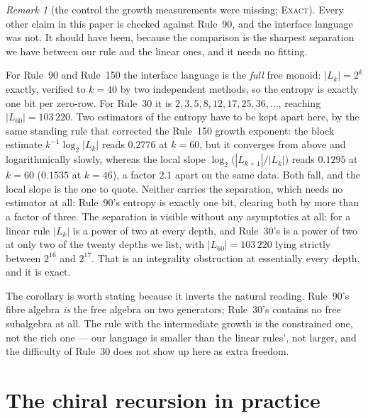 \documentclass[11pt]{article}
\theoremstyle{definition}
\theoremstyle{remark}
\newtheorem{remark}[theorem]{Remark}
\newcommand{\EXACT}{\textsc{Exact}}
\begin{document}
\begin{remark}[the control the growth measurements were missing; \EXACT]\label{ex:l90}
Every other claim in this paper is checked against Rule~90, and the interface language was not. It
should have been, because the comparison is the sharpest separation we have between our rule and the
linear ones, and it needs no fitting.

For Rule~90 and Rule~150 the interface language is the \emph{full} free monoid: $|L_k|=2^k$ exactly,
verified to $k=40$ by two independent methods, so the entropy is exactly one bit per zero-row. For
Rule~30 it is $2,3,5,8,12,17,25,36,\dots$, reaching $|L_{60}|=103\,220$. Two estimators of the entropy
have to be kept apart here, by the same standing rule that corrected the Rule~150 growth exponent: the
block estimate $k^{-1}\log_2|L_k|$ reads $0.2776$ at $k=60$, but it converges from above and
logarithmically slowly, whereas the local slope $\log_2\bigl(|L_{k+1}|/|L_k|\bigr)$ reads $0.1295$ at $k=60$ ($0.1535$ at $k=46$), a
factor $2.1$ apart on the same data. Both fall, and the local slope is the one to quote. Neither
carries the separation, which needs no estimator at all: Rule~90's entropy is exactly one bit, clearing
both by more than a factor of three. The separation is visible without any asymptotics at all: for a linear rule $|L_k|$ is a power
of two at every depth, and Rule~30's is a power of two at only two of the twenty depths we list, with
$|L_{60}|=103\,220$ lying strictly between $2^{16}$ and $2^{17}$. That is an integrality obstruction at
essentially every depth, and it is exact.

The corollary is worth stating because it inverts the natural reading. Rule~90's fibre algebra
\emph{is} the free algebra on two generators; Rule~30's contains no free subalgebra at all. The rule
with the intermediate growth is the constrained one, not the rich one --- our language is smaller than
the linear rules', not larger, and the difficulty of Rule~30 does not show up here as extra freedom.
\end{remark}

\section{The chiral recursion in practice}\label{du:chiral}
\end{document}
